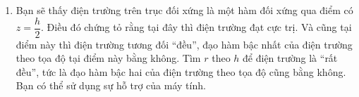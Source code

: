 \begin{vd}
\begin{enumerate}[1)]
\begin{center}

        \end{center}
        \item Bạn sẽ thấy điện trường trên trục đối xứng là một hàm đối xứng qua điểm có $z=\dfrac{h}{2}$. Điều đó chứng tỏ rằng tại đây thì điện trường đạt cực trị. Và cũng tại điểm này thì điện trường tương đối ``đều'', đạo hàm bậc nhất của điện trường theo tọa độ tại điểm này bằng không. Tìm $r$ theo $h$ để điện trường là ``rất đều'', tức là đạo hàm bậc hai của điện trường theo tọa độ cũng bằng không. Bạn có thể sử dụng sự hỗ trợ của máy tính.
    \end{enumerate}
    \end{vd}
